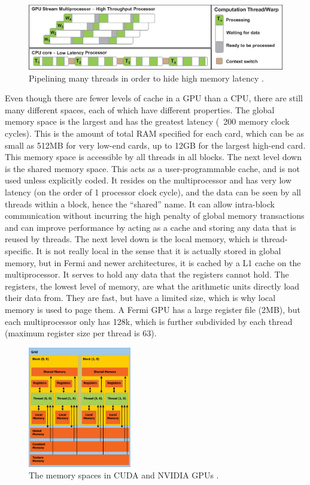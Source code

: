 \begin{figure}[h!] 
  \centering
    \includegraphics[width=\textwidth]{graphics/pipeline.eps}
     \caption{Pipelining many threads in order to hide high memory latency \cite{cuda_gtc_pres}. \label{pipeline}}
\end{figure}

Even though there are fewer levels of cache in a GPU than a CPU, there are still many different spaces, each of which have different properties.  The global memory space is the largest and has the greatest latency (~200 memory clock cycles).  This is the amount of total RAM specified for each card, which can be as small as 512MB for very low-end cards, up to 12GB for the largest high-end card.  This memory space is accessible by all threads in all blocks.  The next level down is the shared memory space.  This acts as a user-programmable cache, and is not used unless explicitly coded.  It resides on the multiprocessor and has very low latency (on the order of 1 processor clock cycle), and the data can be seen by all threads within a block, hence the ``shared'' name.  It can allow intra-block communication  without incurring the high penalty of global memory transactions and can improve performance by acting as a cache and storing any data that is reused by threads.  The next level down is the local memory, which is thread-specific.  It is not really local in the sense that it is actually stored in global memory, but in Fermi and newer architectures, it is cached by a  L1 cache on the multiprocessor.  It serves to hold any data that the registers cannot hold.  The registers, the lowest level of memory, are what the arithmetic units directly load their data from.  They are fast, but have a limited size, which is why local memory is used to page them.  A Fermi GPU  has a large register file (2MB), but each multiprocessor only has 128k, which is further subdivided by each thread (maximum register size per thread is 63).

\begin{figure}[h!] 
  \centering
    \includegraphics[width=0.4\textwidth]{graphics/CUDA_memory.eps}
     \caption{The memory spaces in CUDA and NVIDIA GPUs \cite{cuda}. \label{cuda_mem}}
\end{figure}

